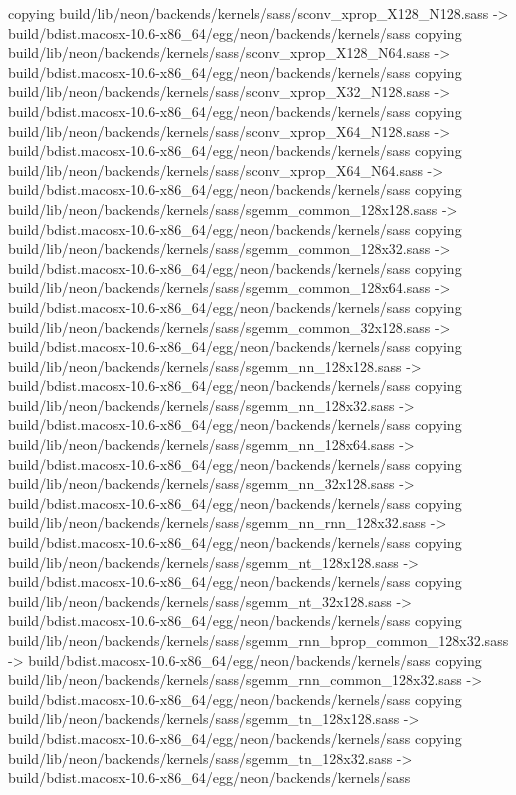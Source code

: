 copying build/lib/neon/backends/kernels/sass/sconv_xprop_X128_N128.sass -> build/bdist.macosx-10.6-x86_64/egg/neon/backends/kernels/sass
copying build/lib/neon/backends/kernels/sass/sconv_xprop_X128_N64.sass -> build/bdist.macosx-10.6-x86_64/egg/neon/backends/kernels/sass
copying build/lib/neon/backends/kernels/sass/sconv_xprop_X32_N128.sass -> build/bdist.macosx-10.6-x86_64/egg/neon/backends/kernels/sass
copying build/lib/neon/backends/kernels/sass/sconv_xprop_X64_N128.sass -> build/bdist.macosx-10.6-x86_64/egg/neon/backends/kernels/sass
copying build/lib/neon/backends/kernels/sass/sconv_xprop_X64_N64.sass -> build/bdist.macosx-10.6-x86_64/egg/neon/backends/kernels/sass
copying build/lib/neon/backends/kernels/sass/sgemm_common_128x128.sass -> build/bdist.macosx-10.6-x86_64/egg/neon/backends/kernels/sass
copying build/lib/neon/backends/kernels/sass/sgemm_common_128x32.sass -> build/bdist.macosx-10.6-x86_64/egg/neon/backends/kernels/sass
copying build/lib/neon/backends/kernels/sass/sgemm_common_128x64.sass -> build/bdist.macosx-10.6-x86_64/egg/neon/backends/kernels/sass
copying build/lib/neon/backends/kernels/sass/sgemm_common_32x128.sass -> build/bdist.macosx-10.6-x86_64/egg/neon/backends/kernels/sass
copying build/lib/neon/backends/kernels/sass/sgemm_nn_128x128.sass -> build/bdist.macosx-10.6-x86_64/egg/neon/backends/kernels/sass
copying build/lib/neon/backends/kernels/sass/sgemm_nn_128x32.sass -> build/bdist.macosx-10.6-x86_64/egg/neon/backends/kernels/sass
copying build/lib/neon/backends/kernels/sass/sgemm_nn_128x64.sass -> build/bdist.macosx-10.6-x86_64/egg/neon/backends/kernels/sass
copying build/lib/neon/backends/kernels/sass/sgemm_nn_32x128.sass -> build/bdist.macosx-10.6-x86_64/egg/neon/backends/kernels/sass
copying build/lib/neon/backends/kernels/sass/sgemm_nn_rnn_128x32.sass -> build/bdist.macosx-10.6-x86_64/egg/neon/backends/kernels/sass
copying build/lib/neon/backends/kernels/sass/sgemm_nt_128x128.sass -> build/bdist.macosx-10.6-x86_64/egg/neon/backends/kernels/sass
copying build/lib/neon/backends/kernels/sass/sgemm_nt_32x128.sass -> build/bdist.macosx-10.6-x86_64/egg/neon/backends/kernels/sass
copying build/lib/neon/backends/kernels/sass/sgemm_rnn_bprop_common_128x32.sass -> build/bdist.macosx-10.6-x86_64/egg/neon/backends/kernels/sass
copying build/lib/neon/backends/kernels/sass/sgemm_rnn_common_128x32.sass -> build/bdist.macosx-10.6-x86_64/egg/neon/backends/kernels/sass
copying build/lib/neon/backends/kernels/sass/sgemm_tn_128x128.sass -> build/bdist.macosx-10.6-x86_64/egg/neon/backends/kernels/sass
copying build/lib/neon/backends/kernels/sass/sgemm_tn_128x32.sass -> build/bdist.macosx-10.6-x86_64/egg/neon/backends/kernels/sass
